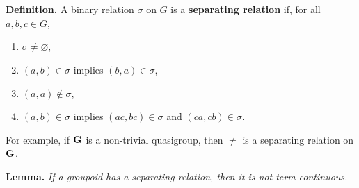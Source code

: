 \documentclass{beamer}
\newcommand{\G}{{\rm{\textbf{G}}}}
\begin{document}
\begin{frame}
${}$
\end{frame}






\section[Separating Relations]{}

\begin{frame}
\textbf{Definition.}  A binary relation $\sigma$ on $G$ is a \textbf{separating relation} if, for all $a,b,c \in G$, 
\begin{enumerate}
   \item $\sigma \neq \varnothing$,
   \item $(a,b)\in \sigma$ implies $(b,a)\in \sigma$, 
   \item $(a,a) \notin \sigma$, 
   \item $(a,b) \in \sigma$ implies $(ac,bc)\in \sigma$ and $(ca,cb)\in \sigma$.
\end{enumerate} 
\medskip
\pause

For example,  if $\G$ is a non-trivial quasigroup, then $\neq$ is a separating relation on $\G$.
\medskip
\pause


\textbf{Lemma.} {\sl If a groupoid has a separating relation, then it is not term continuous.}

\end{frame}
\end{document}
